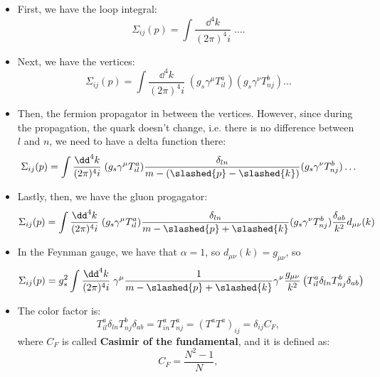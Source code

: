 \begin{itemize}
    \item First, we have the loop integral:
        \begin{equation*}
            \Sigma_{ij}(p) = \int \frac{\dd^4 k}{(2\pi)^4i}\; \ldots.
        \end{equation*}
    \item Next, we have the vertices:
        \begin{equation}
            \Sigma_{ij}(p) = \int \frac{\dd^4 k}{(2\pi)^4i}\; (g_s \gamma^{\mu} T^a_{il})(g_s \gamma^{\nu} T^b_{nj}) \ldots
        \end{equation}
    \item Then, the fermion propagator in between the vertices. However, since during the propagation, the quark doesn't change, i.e. there is no difference between $l$ and $n$, we need to have a delta function there:
        \begin{equation}
            \Sigma_{ij}(p) = \int \frac{\dd^4 k}{(2\pi)^4i}\; (g_s \gamma^{\mu} T^a_{il}) \frac{\delta_{ln}}{m - (\slashed{p} - \slashed{k})}(g_s \gamma^{\nu} T^b_{nj}) \ldots
        \end{equation}
    \item Lastly, then, we have the gluon progagator:
        \begin{equation}
            \Sigma_{ij}(p) = \int \frac{\dd^4 k}{(2\pi)^4i}\; (g_s \gamma^{\mu} T^a_{il}) \frac{\delta_{ln}}{m - \slashed{p} + \slashed{k}}(g_s \gamma^{\nu} T^b_{nj}) \frac{\delta_{ab}}{k^2}d_{\mu\nu}(k)
        \end{equation}
    \item In the Feynman gauge, we have that $\alpha=1$, so $d_{\mu\nu}(k) = g_{\mu\nu}$, so
        \begin{equation}
            \Sigma_{ij}(p) = g_s^2 \int \frac{\dd^4 k}{(2\pi)^4i}\; \gamma^{\mu} \frac{1}{m - \slashed{p} + \slashed{k}}\gamma^{\nu}  \frac{g_{\mu\nu}}{k^2}\left(T^a_{il}\delta_{ln}T^b_{nj}\delta_{ab}\right)
        \end{equation}
    \item The color factor is:
        \begin{equation}
            T^a_{il}\delta_{ln}T^b_{nj}\delta_{ab} = T^a_{in}T^a_{nj} = \left(T^aT^a\right)_{ij} = \delta_{ij}C_F,
        \end{equation}
        where $C_F$ is called \textbf{Casimir of the fundamental}, and it is defined as:
        \begin{equation}
            C_F = \frac{N^2-1}{N},

\end{equation}
\end{itemize}
